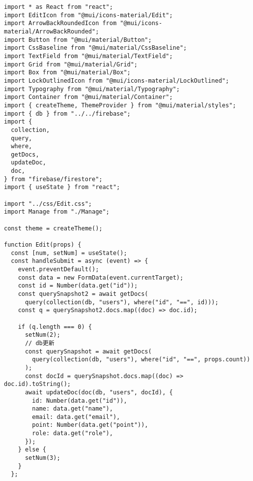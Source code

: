 \begin{verbatim}
import * as React from "react";
import EditIcon from "@mui/icons-material/Edit";
import ArrowBackRoundedIcon from "@mui/icons-material/ArrowBackRounded";
import Button from "@mui/material/Button";
import CssBaseline from "@mui/material/CssBaseline";
import TextField from "@mui/material/TextField";
import Grid from "@mui/material/Grid";
import Box from "@mui/material/Box";
import LockOutlinedIcon from "@mui/icons-material/LockOutlined";
import Typography from "@mui/material/Typography";
import Container from "@mui/material/Container";
import { createTheme, ThemeProvider } from "@mui/material/styles";
import { db } from "../../firebase";
import {
  collection,
  query,
  where,
  getDocs,
  updateDoc,
  doc,
} from "firebase/firestore";
import { useState } from "react";

import "../css/Edit.css";
import Manage from "./Manage";

const theme = createTheme();

function Edit(props) {
  const [num, setNum] = useState();
  const handleSubmit = async (event) => {
    event.preventDefault();
    const data = new FormData(event.currentTarget);
    const id = Number(data.get("id"));
    const querySnapshot2 = await getDocs(
      query(collection(db, "users"), where("id", "==", id)));
    const q = querySnapshot2.docs.map((doc) => doc.id);

    if (q.length === 0) {
      setNum(2);
      // db更新
      const querySnapshot = await getDocs(
        query(collection(db, "users"), where("id", "==", props.count))
      );
      const docId = querySnapshot.docs.map((doc) => doc.id).toString();
      await updateDoc(doc(db, "users", docId), {
        id: Number(data.get("id")),
        name: data.get("name"),
        email: data.get("email"),
        point: Number(data.get("point")),
        role: data.get("role"),
      });
    } else {
      setNum(3);
    }
  };


\end{verbatim}
